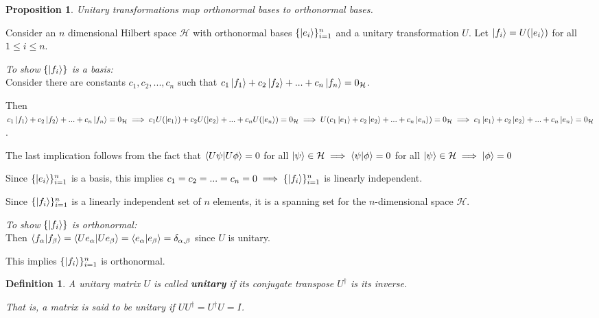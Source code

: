 \documentclass[12pt,twoside,fleqn]{report}
\makeatletter
\theoremstyle{thmstyle}
\renewenvironment{proof}[1][\proofname]{\par
\pushQED{\qed}%
\normalfont \topsep6\p@\@plus6\p@\relax
\trivlist
\item[\hskip\labelsep\itshape#1\@addpunct{.}]\mbox{}\par\nobreak\ignorespaces
}{%
    \popQED\endtrivlist\@endpefalse
    }
\newtheorem{defn}{Definition}[chapter]
\newtheorem{prop}{Proposition}[chapter]
\makeatother
\begin{document}
\begin{prop}
    Unitary transformations map orthonormal bases to orthonormal bases.
\end{prop}
\begin{proof}
    Consider an $n$ dimensional Hilbert space $\mathcal{H}$ with orthonormal bases $\{ \ket{e_i} \}_{i=1}^n$ and a unitary transformation $U$.
    Let $\ket{f_i} = U(\ket{e_i})$ for all $1 \leq i \leq n$.

    \emph{To show $\{ \ket{f_i} \}$ is a basis:}\\
    Consider there are constants $c_1, c_2, ..., c_n$ such that $c_1 \ket{f_1} + c_2 \ket{f_2} + ... + c_n \ket{f_n} = 0_\mathcal{H}$.

    Then $ c_1 \ket{f_1} + c_2 \ket{f_2} + ... + c_n \ket{f_n} = 0_\mathcal{H} \implies c_1 U(\ket{e_1}) + c_2 U(\ket{e_2} + ... + c_n U(\ket{e_n}) = 0_\mathcal{H} \implies U(c_1 \ket{e_1} + c_2 \ket{e_2} + ... + c_n \ket{e_n}) = 0_\mathcal{H} \implies c_1 \ket{e_1} + c_2 \ket{e_2} + ... + c_n \ket{e_n} = 0_\mathcal{H}$.

    The last implication follows from the fact that $\braket{U \psi | U \phi} = 0$ for all $\ket{\psi} \in \mathcal{H} \implies \braket{\psi|\phi} = 0$ for all $\ket\psi \in \mathcal{H} \implies \ket\phi = 0$ 

    Since $\{ \ket{e_i} \}_{i=1}^n$ is a basis, this implies $c_1 = c_2 = ...=  c_n = 0 \implies \{ \ket{f_i} \}_{i=1}^n$ is linearly independent.

    Since $\{ \ket{f_i} \}_{i=1}^n$ is a linearly independent set of $n$ elements, it is a spanning set for the $n$-dimensional space $\mathcal{H}$.

    \emph{To show $\{ \ket{f_i} \}$ is orthonormal:} \\


    Then $\braket{f_\alpha|f_\beta} = \braket{U e_\alpha|U e_\beta} = \braket{e_\alpha|e_\beta} = \delta_{\alpha, \beta}$ since $U$ is unitary.

    This implies $\{ \ket{f_i} \}_{i=1}^n$ is orthonormal.
\end{proof}

\begin{defn}
    A unitary matrix $U$ is called \textbf{unitary} if its conjugate transpose $U^\dagger$ is its inverse.

    That is, a matrix is said to be unitary if $U U^\dagger = U^\dagger U = I$.
\end{defn}
\end{document}
